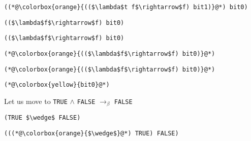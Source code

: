 \documentclass{beamer}
\begin{document}
\begin{frame}[fragile]{\CurrentSection}
\lstset{basicstyle=\ttfamily\small}\lstset{numbers=none}\lstset{language=ML}\begin{lstlisting}
((*@\colorbox{orange}{(($\lambda$t f$\rightarrow$f) bit1)}@*) bit0)
\end{lstlisting}
\pause\lstset{language=ML}\begin{lstlisting}
(($\lambda$f$\rightarrow$f) bit0)
\end{lstlisting}

\end{frame}

\begin{frame}[fragile]{\CurrentSection}
\lstset{basicstyle=\ttfamily\small}\lstset{numbers=none}\lstset{language=ML}\begin{lstlisting}
(($\lambda$f$\rightarrow$f) bit0)
\end{lstlisting}
\pause\lstset{language=ML}\begin{lstlisting}
(*@\colorbox{orange}{(($\lambda$f$\rightarrow$f) bit0)}@*)
\end{lstlisting}

\end{frame}

\begin{frame}[fragile]{\CurrentSection}
\lstset{basicstyle=\ttfamily\small}\lstset{numbers=none}\lstset{language=ML}\begin{lstlisting}
(*@\colorbox{orange}{(($\lambda$f$\rightarrow$f) bit0)}@*)
\end{lstlisting}
\pause\lstset{language=ML}\begin{lstlisting}
(*@\colorbox{yellow}{bit0}@*)
\end{lstlisting}

\end{frame}

\begin{frame}[fragile]{\CurrentSection}
\begin{block}{\CurrentSubSection}
Let us move to \texttt{TRUE} $\wedge$ \texttt{FALSE} $\rightarrow_\beta$ \texttt{FALSE}
\end{block}


\end{frame}

\begin{frame}[fragile]{\CurrentSection}
\lstset{basicstyle=\ttfamily\small}\lstset{numbers=none}\lstset{language=ML}\begin{lstlisting}
(TRUE $\wedge$ FALSE)
\end{lstlisting}
\pause\lstset{language=ML}\begin{lstlisting}
(((*@\colorbox{orange}{$\wedge$}@*) TRUE) FALSE)
\end{lstlisting}

\end{frame}
\end{document}
